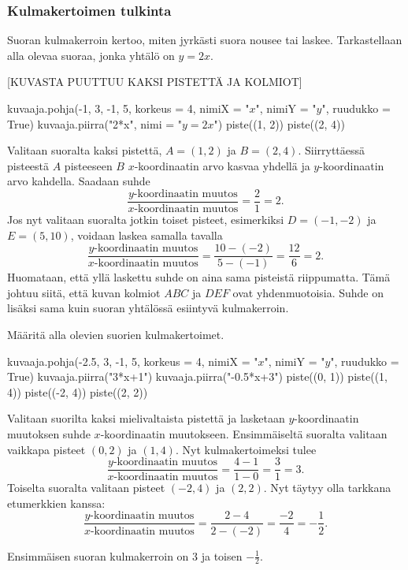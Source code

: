 \subsubsection*{Kulmakertoimen tulkinta}

Suoran kulmakerroin kertoo, miten jyrkästi suora nousee tai laskee. Tarkastellaan alla olevaa suoraa, jonka yhtälö on $y=2x$.

[KUVASTA PUUTTUU KAKSI PISTETTÄ JA KOLMIOT]

\begin{kuva}
    kuvaaja.pohja(-1, 3, -1, 5, korkeus = 4, nimiX = "$x$", nimiY = "$y$", ruudukko = True)
    kuvaaja.piirra("2*x", nimi = "$y=2x$")
    piste((1, 2))
    piste((2, 4))
\end{kuva}


Valitaan suoralta kaksi pistettä,
$A=(1, 2)$ ja $B=(2, 4)$. Siirryttäessä pisteestä $A$ pisteeseen $B$ $x$-koordinaatin arvo kasvaa yhdellä ja $y$-koordinaatin arvo kahdella. Saadaan suhde
\[
\frac{\text{$y$-koordinaatin muutos}}{\text{$x$-koordinaatin muutos}}=\frac{2}{1}=2.
\]
Jos nyt valitaan suoralta jotkin toiset pisteet, esimerkiksi $D=(-1, -2)$ ja $E=(5, 10)$, voidaan laskea samalla tavalla
\[
\frac{\text{$y$-koordinaatin muutos}}{\text{$x$-koordinaatin muutos}}=\frac{10-(-2)}{5-(-1)}=\frac{12}{6}=2.
\]
Huomataan, että yllä laskettu suhde on aina sama pisteistä riippumatta. Tämä johtuu siitä, että kuvan kolmiot $ABC$ ja $DEF$ ovat yhdenmuotoisia.
Suhde on lisäksi sama kuin suoran yhtälössä esiintyvä kulmakerroin.

\begin{esimerkki} Määritä alla olevien suorien kulmakertoimet.


\begin{kuva}
    kuvaaja.pohja(-2.5, 3, -1, 5, korkeus = 4, nimiX = "$x$", nimiY = "$y$", ruudukko = True)
    kuvaaja.piirra("3*x+1")
    kuvaaja.piirra("-0.5*x+3")
    piste((0, 1))
    piste((1, 4))
    piste((-2, 4))
    piste((2, 2))
\end{kuva}

\begin{esimratk} Valitaan suorilta kaksi mielivaltaista pistettä ja lasketaan $y$-koordinaatin muutoksen suhde $x$-koordinaatin muutokseen.
Ensimmäiseltä suoralta valitaan vaikkapa pisteet $(0, 2)$ ja $(1, 4)$. Nyt kulmakertoimeksi tulee
\[
\frac{\text{$y$-koordinaatin muutos}}{\text{$x$-koordinaatin muutos}}=\frac{4-1}{1-0}=\frac{3}{1}=3.
\]
Toiselta suoralta valitaan pisteet $(-2, 4)$ ja $(2, 2)$. Nyt täytyy olla tarkkana etumerkkien kanssa:
\[
\frac{\text{$y$-koordinaatin muutos}}{\text{$x$-koordinaatin muutos}}=\frac{2-4}{2-(-2)}=\frac{-2}{4}=-\frac{1}{2}.
\]
\end{esimratk}

\begin{esimvast}
Ensimmäisen suoran kulmakerroin on $3$ ja toisen $-\frac{1}{2}$.
\end{esimvast}
\end{esimerkki}

